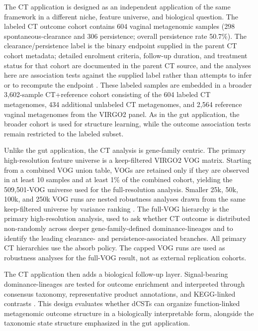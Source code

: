\documentclass[11pt]{article}
\begin{document}
The CT application is designed as an independent application of the same
framework in a different niche, feature universe, and biological question. The
labeled CT outcome cohort contains 604 vaginal metagenomic samples (298
spontaneous-clearance and 306 persistence; overall persistence rate 50.7\%).
The clearance/persistence label is the binary endpoint supplied in the parent
CT cohort metadata; detailed enrolment criteria, follow-up duration, and
treatment status for that cohort are documented in the parent CT source, and
the analyses here are association tests against the supplied label rather than
attempts to infer or to recompute the endpoint
\cite{Edwards2019_CTmicrobiota}. These labeled samples are embedded in a
broader 3,602-sample CT+reference cohort consisting of the 604 labeled CT
metagenomes, 434 additional unlabeled CT metagenomes, and 2,564 reference
vaginal metagenomes from the VIRGO2 panel. As in the gut application, the
broader cohort is used for structure learning, while the outcome association
tests remain restricted to the labeled subset.

Unlike the gut application, the CT analysis is gene-family centric. The primary
high-resolution feature universe is a keep-filtered VIRGO2 VOG matrix. Starting
from a combined VOG union table, VOGs are retained only if they are observed in
at least 10 samples and at least 1\% of the combined cohort, yielding the
509,501-VOG universe used for the full-resolution analysis. Smaller 25k, 50k,
100k, and 250k VOG runs are nested robustness analyses drawn from the same
keep-filtered universe by variance ranking \cite{France2026_VIRGO2}. The
full-VOG hierarchy is the primary high-resolution analysis, used to ask whether
CT outcome is distributed non-randomly across deeper gene-family-defined
dominance-lineages and to identify the leading clearance- and
persistence-associated branches. All primary CT hierarchies use the absorb
policy. The capped VOG runs are used as robustness analyses for the full-VOG
result, not as external replication cohorts.

The CT application then adds a biological follow-up layer. Signal-bearing
dominance-lineages are tested for outcome enrichment and interpreted through
consensus taxonomy, representative product annotations, and KEGG-linked
contrasts \cite{Kanehisa2023_KEGG}. This design evaluates whether dCSTs can
organize function-linked metagenomic outcome structure in a biologically
interpretable form, alongside the taxonomic state structure emphasized in the
gut application.
\end{document}
